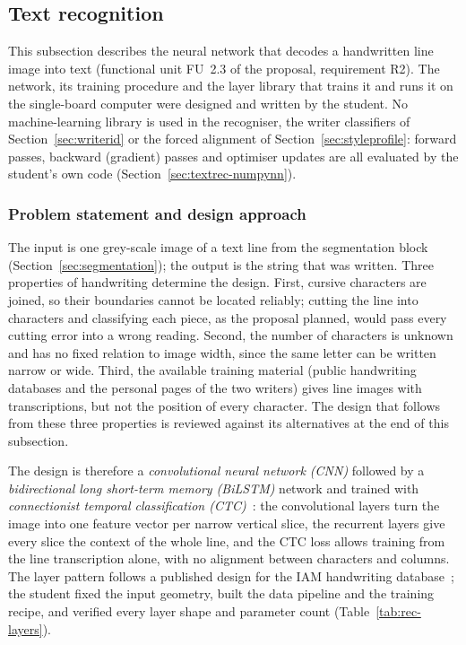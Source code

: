 \subsection{Text recognition}
\label{sec:textrec}

This subsection describes the neural network that decodes a handwritten line image into text (functional unit FU~2.3 of the proposal, requirement R2).
The network, its training procedure and the layer library that trains it and runs it on the single-board computer were designed and written by the student.
No machine-learning library is used in the recogniser, the writer classifiers of Section~\ref{sec:writerid} or the forced alignment of Section~\ref{sec:styleprofile}: forward passes, backward (gradient) passes and optimiser updates are all evaluated by the student's own code (Section~\ref{sec:textrec-numpynn}).

\subsubsection{Problem statement and design approach}

The input is one grey-scale image of a text line from the segmentation block (Section~\ref{sec:segmentation}); the output is the string that was written.
Three properties of handwriting determine the design.
First, cursive characters are joined, so their boundaries cannot be located reliably; cutting the line into characters and classifying each piece, as the proposal planned, would pass every cutting error into a wrong reading.
Second, the number of characters is unknown and has no fixed relation to image width, since the same letter can be written narrow or wide.
Third, the available training material (public handwriting databases and the personal pages of the two writers) gives line images with transcriptions, but not the position of every character.
The design that follows from these three properties is reviewed against its alternatives at the end of this subsection.

The design is therefore a \emph{convolutional neural network (CNN)} followed by a \emph{bidirectional long short-term memory (BiLSTM)} network and trained with \emph{connectionist temporal classification (CTC)}~\cite{graves2006,shi2017}: the convolutional layers turn the image into one feature vector per narrow vertical slice, the recurrent layers give every slice the context of the whole line, and the CTC loss allows training from the line transcription alone, with no alignment between characters and columns.
The layer pattern follows a published design for the IAM handwriting database~\cite{kizilirmak2023}; the student fixed the input geometry, built the data pipeline and the training recipe, and verified every layer shape and parameter count (Table~\ref{tab:rec-layers}).

